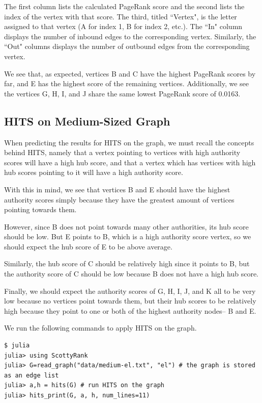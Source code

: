 \documentclass[12pt, titlepage, twoside]{amsart}
\begin{document}
The first column lists the calculated PageRank score and
the second lists the index of the vertex with that score.
The third, titled ``Vertex", is the letter assigned to that vertex (A for index 1, B for index 2, etc.).
The ``In" column displays the number of inbound edges to the corresponding vertex.
Similarly, the ``Out" columns displays the number of outbound edges from the corresponding vertex.

We see that, as expected, vertices B and C have the highest PageRank scores by far,
and E has the highest score of the remaining vertices.
Additionally, we see the vertices G, H, I, and J share the same lowest PageRank score of 0.0163.

\subsection{HITS on Medium-Sized Graph}

When predicting the results for HITS on the graph, we must recall the concepts behind HITS, namely
that a vertex pointing to vertices with high authority scores will have a high hub score,
and that a vertex which has vertices with high hub scores pointing to it will have a high authority score.

With this in mind, we see that vertices B and E should have the highest authority scores
simply because they have the greatest amount of vertices pointing towards them.

However, since B does not point towards many other authorities, its hub score should be low.
But E points to B, which is a high authority score vertex, so we should expect 
the hub score of E to be above average.

Similarly, the hub score of C should be relatively high since it points to B, but the authority score of C should be low because B does not have a high hub score.

Finally, we should expect the authority scores of G, H, I, J, and K all to be very low
because no vertices point towards them,
but their hub scores to be relatively high because they point to
one or both of the highest authority nodes-- B and E.

We run the following commands to apply HITS on the graph.

\begin{verbatim}
$ julia
julia> using ScottyRank
julia> G=read_graph("data/medium-el.txt", "el") # the graph is stored as an edge list
julia> a,h = hits(G) # run HITS on the graph
julia> hits_print(G, a, h, num_lines=11)
\end{verbatim}
\end{document}
